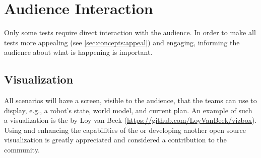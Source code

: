 \section{Audience Interaction}\label{sec:rules:audience}
Only some tests require direct interaction with the audience. In order to make all tests more appealing (see \ref{sec:concepts:appeal}) and engaging, informing the audience about what is happening is important.

\subsection{Visualization}\label{sec:rules:audience:visualization}
All scenarios will have a screen, visible to the audience, that the teams can use to display, e.g., a robot's state, world model, and current plan. An example of such a visualization is the \VizBox{} by Loy van Beek (\url{https://github.com/LoyVanBeek/vizbox}). Using and enhancing the capabilities of the \VizBox{} or developing another open source visualization is greatly appreciated and considered a contribution to the \RoboCup\AtHome{} community.